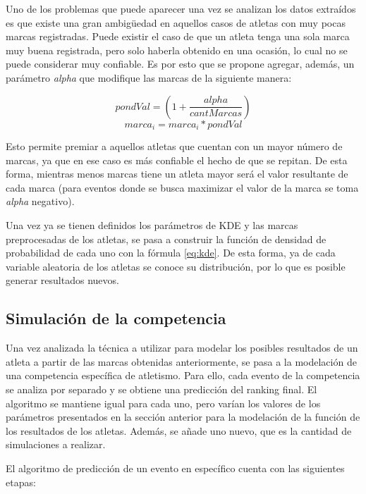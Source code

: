 Uno de los problemas que puede aparecer una vez se analizan los datos extraídos es que existe una gran ambigüedad en aquellos casos de atletas con muy pocas marcas registradas. Puede existir el caso de que un atleta tenga una sola marca muy buena registrada, pero solo haberla obtenido en una ocasión, lo cual no se puede considerar muy confiable. Es por esto que se propone agregar, además, un parámetro \textit{alpha} que modifique las marcas de la siguiente manera:

\begin{equation}
    \label{eqn:alpha1}
    pondVal = (1 + \frac{alpha}{cantMarcas}) 
\end{equation}
\begin{equation}
    \label{eqn:alpha2}
    marca_i = marca_i * pondVal
\end{equation}

Esto permite premiar a aquellos atletas que cuentan con un mayor número de marcas, ya que en ese caso es más confiable el hecho de que se repitan. De esta forma, mientras menos marcas tiene un atleta mayor será el valor resultante de cada marca (para eventos donde se busca maximizar el valor de la marca se toma \textit{alpha} negativo).

Una vez ya se tienen definidos los parámetros de KDE y las marcas preprocesadas de los atletas, se pasa a construir la función de densidad de probabilidad de cada uno con la fórmula \ref{eq:kde}. De esta forma, ya de cada variable aleatoria de los atletas se conoce su distribución, por lo que es posible generar resultados nuevos. 

\subsection{Simulación de la competencia}\label{sec:met_sim}

Una vez analizada la técnica a utilizar para modelar los posibles resultados de un atleta a partir de las marcas obtenidas anteriormente, se pasa a la modelación de una competencia específica de atletismo. Para ello, cada evento de la competencia se analiza por separado y se obtiene una predicción del ranking final. El algoritmo se mantiene igual para cada uno, pero varían los valores de los parámetros presentados en la sección anterior para la modelación de la función de los resultados de los atletas. Además, se añade uno nuevo, que es la cantidad de simulaciones a realizar. 

El algoritmo de predicción de un evento en específico cuenta con las siguientes etapas:

